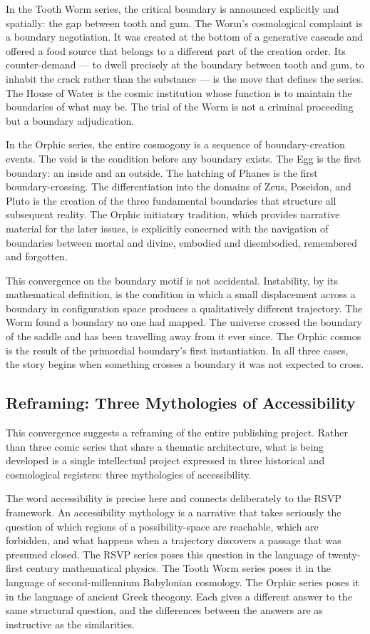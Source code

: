 \documentclass[12pt, a4paper]{article}
\begin{document}
In the Tooth Worm series, the critical boundary is announced explicitly and spatially: the gap between tooth and gum. The Worm's cosmological complaint is a boundary negotiation. It was created at the bottom of a generative cascade and offered a food source that belongs to a different part of the creation order. Its counter-demand --- to dwell precisely at the boundary between tooth and gum, to inhabit the crack rather than the substance --- is the move that defines the series. The House of Water is the cosmic institution whose function is to maintain the boundaries of what may be. The trial of the Worm is not a criminal proceeding but a boundary adjudication.

In the Orphic series, the entire cosmogony is a sequence of boundary-creation events. The void is the condition before any boundary exists. The Egg is the first boundary: an inside and an outside. The hatching of Phanes is the first boundary-crossing. The differentiation into the domains of Zeus, Poseidon, and Pluto is the creation of the three fundamental boundaries that structure all subsequent reality. The Orphic initiatory tradition, which provides narrative material for the later issues, is explicitly concerned with the navigation of boundaries between mortal and divine, embodied and disembodied, remembered and forgotten.

This convergence on the boundary motif is not accidental. Instability, by its mathematical definition, is the condition in which a small displacement across a boundary in configuration space produces a qualitatively different trajectory. The Worm found a boundary no one had mapped. The universe crossed the boundary of the saddle and has been travelling away from it ever since. The Orphic cosmos is the result of the primordial boundary's first instantiation. In all three cases, the story begins when something crosses a boundary it was not expected to cross.

\subsection{Reframing: Three Mythologies of Accessibility}

This convergence suggests a reframing of the entire publishing project. Rather than three comic series that share a thematic architecture, what is being developed is a single intellectual project expressed in three historical and cosmological registers: three mythologies of accessibility.

The word accessibility is precise here and connects deliberately to the RSVP framework. An accessibility mythology is a narrative that takes seriously the question of which regions of a possibility-space are reachable, which are forbidden, and what happens when a trajectory discovers a passage that was presumed closed. The RSVP series poses this question in the language of twenty-first century mathematical physics. The Tooth Worm series poses it in the language of second-millennium Babylonian cosmology. The Orphic series poses it in the language of ancient Greek theogony. Each gives a different answer to the same structural question, and the differences between the answers are as instructive as the similarities.
\end{document}
